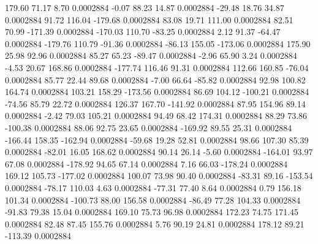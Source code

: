       179.60       71.17        8.70     0.0002884
       -0.07       88.23       14.87     0.0002884
      -29.48       18.76       34.87     0.0002884
       91.72      116.04     -179.68     0.0002884
       83.08       19.71      111.00     0.0002884
       82.51       70.99     -171.39     0.0002884
     -170.03      110.70      -83.25     0.0002884
        2.12       91.37      -64.47     0.0002884
     -179.76      110.79      -91.36     0.0002884
      -86.13      155.05     -173.06     0.0002884
      175.90       25.98       92.96     0.0002884
       85.27       65.23      -89.47     0.0002884
       -2.96       65.90        3.24     0.0002884
       -4.53       20.67      168.86     0.0002884
     -177.74      116.46       91.31     0.0002884
      112.66      160.85      -76.04     0.0002884
       85.77       22.44       89.68     0.0002884
       -7.00       66.64      -85.82     0.0002884
       92.98      100.82      164.74     0.0002884
      103.21      158.29     -173.56     0.0002884
       86.69      104.12     -100.21     0.0002884
      -74.56       85.79       22.72     0.0002884
      126.37      167.70     -141.92     0.0002884
       87.95      154.96       89.14     0.0002884
       -2.42       79.03      105.21     0.0002884
       94.49       68.42      174.31     0.0002884
       88.29       73.86     -100.38     0.0002884
       88.06       92.75       23.65     0.0002884
     -169.92       89.55       25.31     0.0002884
     -166.44      158.35     -162.94     0.0002884
      -59.68       19.28       52.81     0.0002884
       98.66      107.30       85.39     0.0002884
      -82.01       16.05      168.62     0.0002884
       90.14       26.14       -5.60     0.0002884
     -164.01       93.97       67.08     0.0002884
     -178.92       94.65       67.14     0.0002884
        7.16       66.03     -178.24     0.0002884
      169.12      105.73     -177.02     0.0002884
      100.07       73.98       90.40     0.0002884
      -83.31       89.16     -153.54     0.0002884
      -78.17      110.03        4.63     0.0002884
      -77.31       77.40        8.64     0.0002884
        0.79      156.18      101.34     0.0002884
     -100.73       88.00      156.58     0.0002884
      -86.49       77.28      104.33     0.0002884
      -91.83       79.38       15.04     0.0002884
      169.10       75.73       96.98     0.0002884
      172.23       74.75      171.45     0.0002884
       82.48       87.45      155.76     0.0002884
        5.76       90.19       24.81     0.0002884
      178.12       89.21     -113.39     0.0002884
